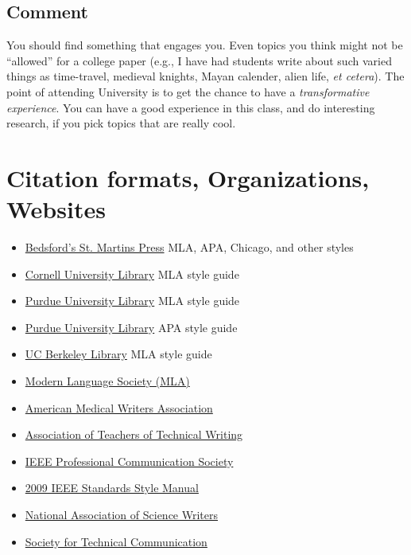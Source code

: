 \documentclass [11pt]{article}
\begin{document}
\subsection{Comment}  
You should find something that engages you. Even topics you think might not be ``allowed'' for a college paper (e.g., I have had students write about such varied things as time-travel, medieval knights, Mayan calender, alien life, \textsl{et cetera}). The point of attending University is to get the chance to have a \emph{transformative experience}. You can have a good experience in this class, and do interesting research, if you pick topics that are really cool.

\section{Citation formats, Organizations, Websites}
\begin{itemize}
\item \href{http://www.bedfordstmartins.com/online/citex.html}{Bedsford's St. Martins Press} MLA, APA, Chicago, and other styles 
\item \href{http://www.library.cornell.edu/resrch/citmanage/mla}{Cornell University Library} MLA style guide
\item \href{http://owl.english.purdue.edu/owl/resource/557/01/}{Purdue University Library} MLA style guide
\item \href{http://owl.english.purdue.edu/owl/resource/560/01/}{Purdue University Library} APA style guide
\item \href{http://www.lib.berkeley.edu/instruct/guides/mlastyle.pdf}{UC Berkeley Library} MLA style guide
\item \href{http://languagelog.ldc.upenn.edu/nll/}{Modern Language Society (MLA)}
\item\href{http://www.amwa.org/}{American Medical Writers Association}
\item\href{http://www.attw.org/}{Association of Teachers of Technical Writing}
\item\href{http://www.ieeepcs.org/}{IEEE Professional Communication Society}
\item \href{http://standards.ieee.org/guides/style/2009_Style_Manual.pdf}{2009 IEEE Standards Style Manual}
\item\href{http://nasw.org/}{National Association of Science Writers}
\item\href{http://www.stc.org/}{Society for Technical Communication}\end{itemize}
\end{document}
